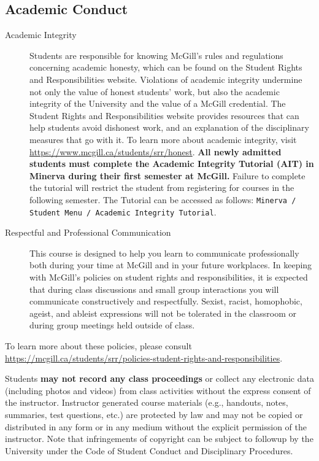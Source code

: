 \documentclass{article}
\begin{document}
\newpage

\subsection{Academic Conduct}

\begin{description} 
\item[Academic Integrity]{Students are responsible for knowing
  McGill's rules and regulations concerning academic honesty, which
  can be found on the Student Rights and Responsibilities
  website. Violations of academic integrity undermine not only the
  value of honest students' work, but also the academic integrity of
  the University and the value of a McGill credential. The Student
  Rights and Responsibilities website provides resources that can help
  students avoid dishonest work, and an explanation of the
  disciplinary measures that go with it. To learn more about academic
  integrity, visit \url{https://www.mcgill.ca/students/srr/honest}.
  {\bf All newly admitted students must complete the Academic
    Integrity Tutorial (AIT) in Minerva during their first semester at
    McGill.} Failure to complete the tutorial will restrict the
  student from registering for courses in the following semester. The
  Tutorial can be accessed as follows: \texttt{Minerva / Student Menu
    / Academic Integrity Tutorial}.}
\item[Respectful and Professional Communication]{This course is
  designed to help you learn to communicate professionally both during
  your time at McGill and in your future workplaces. In keeping with
  McGill's policies on student rights and responsibilities, it is
  expected that during class discussions and small group interactions
  you will communicate constructively and respectfully. Sexist,
  racist, homophobic, ageist, and ableist expressions will not be
  tolerated in the classroom or during group meetings held outside of
  class.}
 \end{description}

To learn more about these policies, please consult 
\url{https://mcgill.ca/students/srr/policies-student-rights-and-responsibilities}.

Students {\bf may not record any class proceedings} or collect any
electronic data (including photos and videos) from class activities
without the express consent of the instructor. Instructor generated
course materials (e.g., handouts, notes, summaries, test questions,
etc.) are protected by law and may not be copied or distributed in any
form or in any medium without the explicit permission of the
instructor. Note that infringements of copyright can be subject to
followup by the University under the Code of Student Conduct and
Disciplinary Procedures.
\end{document}
